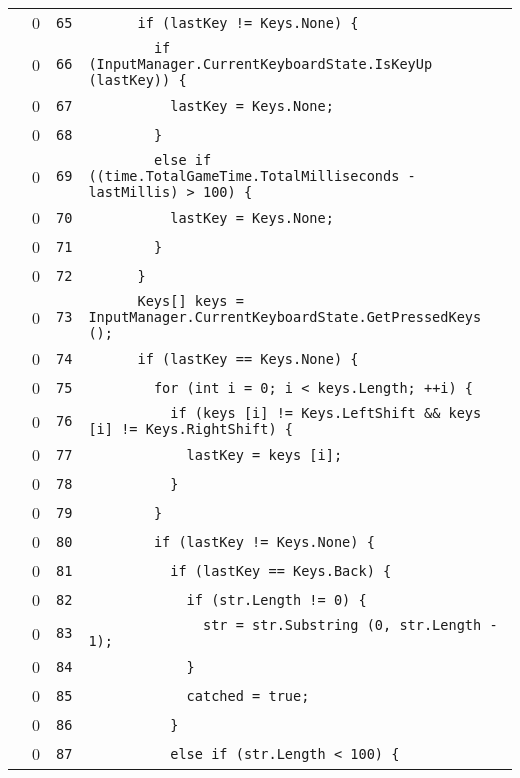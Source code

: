 \documentclass[a4paper,10pt]{article}
\begin{document}
\begin{longtable}[l]{lrrl}
\cellcolor{red} & 0 & \verb~65~ & \verb~      if (lastKey != Keys.None) {~\\
\cellcolor{red} & 0 & \verb~66~ & \verb~        if (InputManager.CurrentKeyboardState.IsKeyUp (lastKey)) {~\\
\cellcolor{red} & 0 & \verb~67~ & \verb~          lastKey = Keys.None;~\\
\cellcolor{red} & 0 & \verb~68~ & \verb~        }~\\
\cellcolor{red} & 0 & \verb~69~ & \verb~        else if ((time.TotalGameTime.TotalMilliseconds - lastMillis) > 100) {~\\
\cellcolor{red} & 0 & \verb~70~ & \verb~          lastKey = Keys.None;~\\
\cellcolor{red} & 0 & \verb~71~ & \verb~        }~\\
\cellcolor{red} & 0 & \verb~72~ & \verb~      }~\\
\cellcolor{red} & 0 & \verb~73~ & \verb~      Keys[] keys = InputManager.CurrentKeyboardState.GetPressedKeys ();~\\
\cellcolor{red} & 0 & \verb~74~ & \verb~      if (lastKey == Keys.None) {~\\
\cellcolor{red} & 0 & \verb~75~ & \verb~        for (int i = 0; i < keys.Length; ++i) {~\\
\cellcolor{red} & 0 & \verb~76~ & \verb~          if (keys [i] != Keys.LeftShift && keys [i] != Keys.RightShift) {~\\
\cellcolor{red} & 0 & \verb~77~ & \verb~            lastKey = keys [i];~\\
\cellcolor{red} & 0 & \verb~78~ & \verb~          }~\\
\cellcolor{red} & 0 & \verb~79~ & \verb~        }~\\
\cellcolor{red} & 0 & \verb~80~ & \verb~        if (lastKey != Keys.None) {~\\
\cellcolor{red} & 0 & \verb~81~ & \verb~          if (lastKey == Keys.Back) {~\\
\cellcolor{red} & 0 & \verb~82~ & \verb~            if (str.Length != 0) {~\\
\cellcolor{red} & 0 & \verb~83~ & \verb~              str = str.Substring (0, str.Length - 1);~\\
\cellcolor{red} & 0 & \verb~84~ & \verb~            }~\\
\cellcolor{red} & 0 & \verb~85~ & \verb~            catched = true;~\\
\cellcolor{red} & 0 & \verb~86~ & \verb~          }~\\
\cellcolor{red} & 0 & \verb~87~ & \verb~          else if (str.Length < 100) {~\\

\end{longtable}
\end{document}

